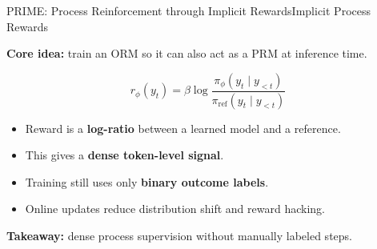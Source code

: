 \documentclass[
  english,            %
  aspectratio=169,    %
]{tumbeamer}
\begin{document}

\begin{frame}[t]{PRIME: Process Reinforcement through Implicit Rewards}{Implicit Process Rewards}
\footnotesize

\textbf{Core idea:} train an ORM so it can also act as a PRM at inference time.

\vspace{3mm}

\[
  r_\phi(y_t)
  =
  \beta \log
  \frac{\pi_\phi(y_t \mid y_{<t})}
       {\pi_\text{ref}(y_t \mid y_{<t})}
\]

\vspace{1mm}

\begin{itemize}
  \setlength\itemsep{4pt}
  \item Reward is a \textbf{log-ratio} between a learned model and a reference.
  \item This gives a \textbf{dense token-level signal}.
  \item Training still uses only \textbf{binary outcome labels}.
  \item Online updates reduce distribution shift and reward hacking.
\end{itemize}

\vspace{2mm}

\begin{center}
\textbf{Takeaway:} dense process supervision without manually labeled steps.
\end{center}

\end{frame}


\end{document}
